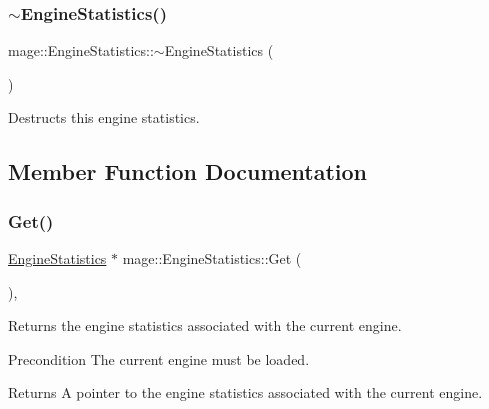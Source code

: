 \subsubsection{\texorpdfstring{$\sim$\+Engine\+Statistics()}{~EngineStatistics()}}
{\footnotesize\ttfamily mage\+::\+Engine\+Statistics\+::$\sim$\+Engine\+Statistics (\begin{DoxyParamCaption}{ }\end{DoxyParamCaption})\hspace{0.3cm}{\ttfamily [default]}}

Destructs this engine statistics. 

\subsection{Member Function Documentation}
\hypertarget{structmage_1_1_engine_statistics_a7eb0d3a988676f71eea8e9f26ab07f42}{}\label{structmage_1_1_engine_statistics_a7eb0d3a988676f71eea8e9f26ab07f42} 
\subsubsection{\texorpdfstring{Get()}{Get()}}
{\footnotesize\ttfamily \hyperlink{structmage_1_1_engine_statistics}{Engine\+Statistics} $\ast$ mage\+::\+Engine\+Statistics\+::\+Get (\begin{DoxyParamCaption}{ }\end{DoxyParamCaption})\hspace{0.3cm}{\ttfamily [static]}, {\ttfamily [noexcept]}}

Returns the engine statistics associated with the current engine.

\begin{DoxyPrecond}{Precondition}
The current engine must be loaded. 
\end{DoxyPrecond}
\begin{DoxyReturn}{Returns}
A pointer to the engine statistics associated with the current engine. 
\end{DoxyReturn}
\hypertarget{structmage_1_1_engine_statistics_ae583e788f11e419e05de47cbb01be279}{}\label{structmage_1_1_engine_statistics_ae583e788f11e419e05de47cbb01be279} 
